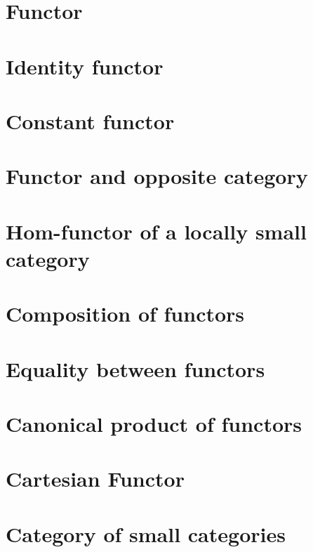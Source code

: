 \section{Functor}
    
\section{Identity functor}
    
\section{Constant functor}
    
\section{Functor and opposite category}
    
\section{Hom-functor of a locally small category}
    
\section{Composition of functors}
    
\section{Equality between functors}
    
\section{Canonical product of functors}
    
\section{Cartesian Functor}
    
\section{Category of small categories}
    
